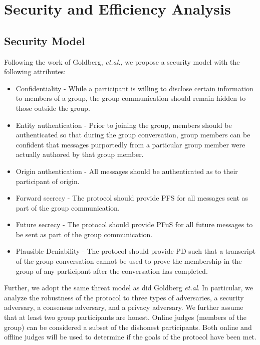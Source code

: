 \documentclass[%
preprint,
amsmath,amssymb,
aps,
prb,
floatfix,
]{revtex4-1}
\begin{document}
\section{\label{sec:analysis}Security and Efficiency Analysis}

\subsection{\label{sec:securitymodel}Security Model}
Following the work of Goldberg, \textit{et.al.}\cite{ref:goldberg}, we propose a
security model with the following attributes:
\begin{itemize}
\item Confidentiality - While a participant is willing to disclose certain
information to members of a group, the group communication should remain hidden
to those outside the group.
\item Entity authentication - Prior to joining the group, members should be
authenticated so that during the group conversation, group members can be
confident that messages purportedly from a particular group member were
actually authored by that group member.
\item Origin authentication - All messages should be authenticated as to their
participant of origin.
\item Forward secrecy - The protocol should provide PFS for all messages sent as
part of the group communication.
\item Future secrecy - The protocol should provide PFuS for all future messages
to be sent as part of the group communication.
\item Plausible Deniability - The protocol should provide PD such that a
transcript of the group conversation cannot be used to prove the membership in
the group of any participant after the conversation has completed.
\end{itemize}

Further, we adopt the same threat model as did Goldberg
\textit{et.al}\cite{ref:goldberg}. In particular, we analyze the robustness of
the protocol to three types of adversaries, a security adversary, a consensus
adversary, and a privacy adversary. We further assume that at least two group
participants are honest. Online judges (members of the group) can
be considered a subset of the dishonest participants. Both online and offline
judges will be used to determine if the goals of the protocol have been met.
\end{document}
